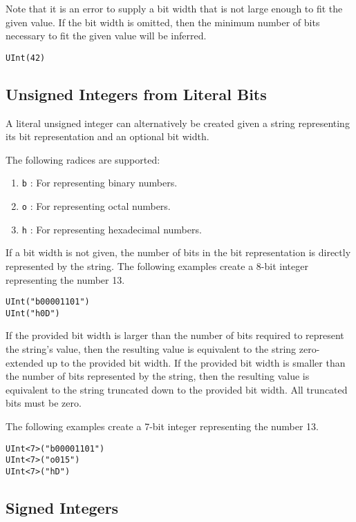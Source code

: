 \documentclass[12pt]{article}
\begin{document}
Note that it is an error to supply a bit width that is not large enough to fit the given value. If the bit width is omitted, then the minimum number of bits necessary to fit the given value will be inferred.
\begin{lstlisting}
UInt(42)
\end{lstlisting}

\subsection{Unsigned Integers from Literal Bits}

A literal unsigned integer can alternatively be created given a string representing its bit representation and an optional bit width.

The following radices are supported:
\begin{enumerate}
\item \verb|b| : For representing binary numbers.
\item \verb|o| : For representing octal numbers.
\item \verb|h| : For representing hexadecimal numbers.
\end{enumerate}

If a bit width is not given, the number of bits in the bit representation is directly represented by the string. The following examples create a 8-bit integer representing the number 13.
\begin{lstlisting}
UInt("b00001101")
UInt("h0D")
\end{lstlisting}

If the provided bit width is larger than the number of bits required to represent the string's value, then the resulting value is equivalent to the string zero-extended up to the provided bit width. If the provided bit width is smaller than the number of bits represented by the string, then the resulting value is equivalent to the string truncated down to the provided bit width. All truncated bits must be zero.

The following examples create a 7-bit integer representing the number 13.
\begin{lstlisting}
UInt<7>("b00001101")
UInt<7>("o015")
UInt<7>("hD")
\end{lstlisting}

\subsection{Signed Integers}
\end{document}
